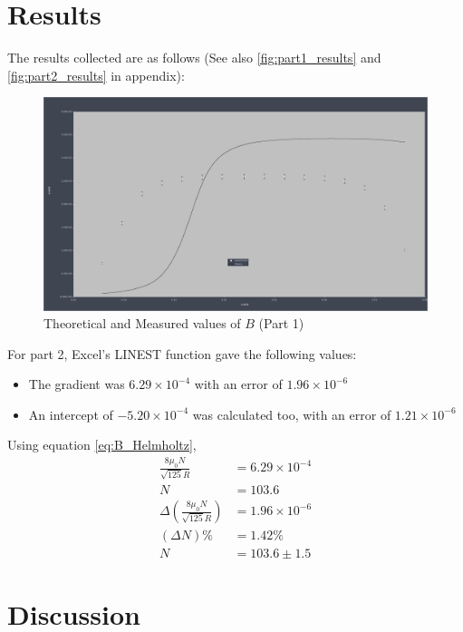 \documentclass[12pt]{article}
\begin{document}
\section{Results}
The results collected are as follows (See also \ref{fig:part1_results} and \ref{fig:part2_results} in appendix):
\begin{figure}[!ht]
    \includegraphics[width=\textwidth]{solenoid_graph.png}
    \caption{Theoretical and Measured values of $B$ (Part 1)}

\end{figure}

For part 2, Excel's LINEST function gave the following values:
\begin{itemize}
    \item The gradient was $6.29\times10^{-4}$ with an error of $1.96\times10^{-6}$
    \item An intercept of $-5.20\times10^{-4}$ was calculated too, with an error of $1.21\times10^{-6}$
\end{itemize}
Using equation \ref{eq:B_Helmholtz},
\begin{equation*}
    \begin{aligned}
        \frac{8\mu_0N}{\sqrt{125}R}                    & = 6.29\times10^{-4} \\
        N                                              & = 103.6             \\
        \Delta\left(\frac{8\mu_0N}{\sqrt{125}R}\right) & = 1.96\times10^{-6} \\
        (\Delta N)\%                                   & = 1.42\%            \\
        N                                              & = 103.6\pm1.5
    \end{aligned}
\end{equation*}
\section{Discussion}
\end{document}
